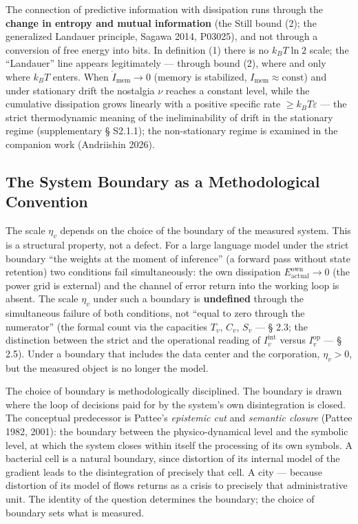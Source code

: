 \documentclass[pdflatex,sn-mathphys-ay]{sn-jnl}
\begin{document}
The connection of predictive information with dissipation runs through the \textbf{change in entropy and mutual information} (the Still bound (2); the generalized Landauer principle, Sagawa 2014, P03025), and not through a conversion of free energy into bits. In definition (1) there is no \(k_B T \ln 2\) scale; the ``Landauer'' line appears legitimately --- through bound (2), where and only where \(k_B T\) enters. When \(\dot I_{\text{mem}} \to 0\) (memory is stabilized, \(I_{\text{mem}} \approx \text{const}\)) and under stationary drift the nostalgia \(\nu\) reaches a constant level, while the cumulative dissipation grows linearly with a positive specific rate \(\ge k_B T \varepsilon\) --- the strict thermodynamic meaning of the ineliminability of drift in the stationary regime (supplementary § S2.1.1); the non-stationary regime is examined in the companion work (Andriishin 2026).

\subsection{The System Boundary as a Methodological Convention}\label{the-system-boundary-as-a-methodological-convention}

The scale \(\eta_v\) depends on the choice of the boundary of the measured system. This is a structural property, not a defect. For a large language model under the strict boundary ``the weights at the moment of inference'' (a forward pass without state retention) two conditions fail simultaneously: the own dissipation \(E_{\text{actual}}^{\text{own}} \to 0\) (the power grid is external) and the channel of error return into the working loop is absent. The scale \(\eta_v\) under such a boundary is \textbf{undefined} through the simultaneous failure of both conditions, not ``equal to zero through the numerator'' (the formal count via the capacities \(T_v\), \(C_v\), \(S_v\) --- § 2.3; the distinction between the strict and the operational reading of \(I_v^{\text{int}}\) versus \(I_v^{\text{op}}\) --- § 2.5). Under a boundary that includes the data center and the corporation, \(\eta_v > 0\), but the measured object is no longer the model.

The choice of boundary is methodologically disciplined. The boundary is drawn where the loop of decisions paid for by the system's own disintegration is closed. The conceptual predecessor is Pattee's \emph{epistemic cut} and \emph{semantic closure} (Pattee 1982, 2001): the boundary between the physico-dynamical level and the symbolic level, at which the system closes within itself the processing of its own symbols. A bacterial cell is a natural boundary, since distortion of its internal model of the gradient leads to the disintegration of precisely that cell. A city --- because distortion of its model of flows returns as a crisis to precisely that administrative unit. The identity of the question determines the boundary; the choice of boundary sets what is measured.
\end{document}
